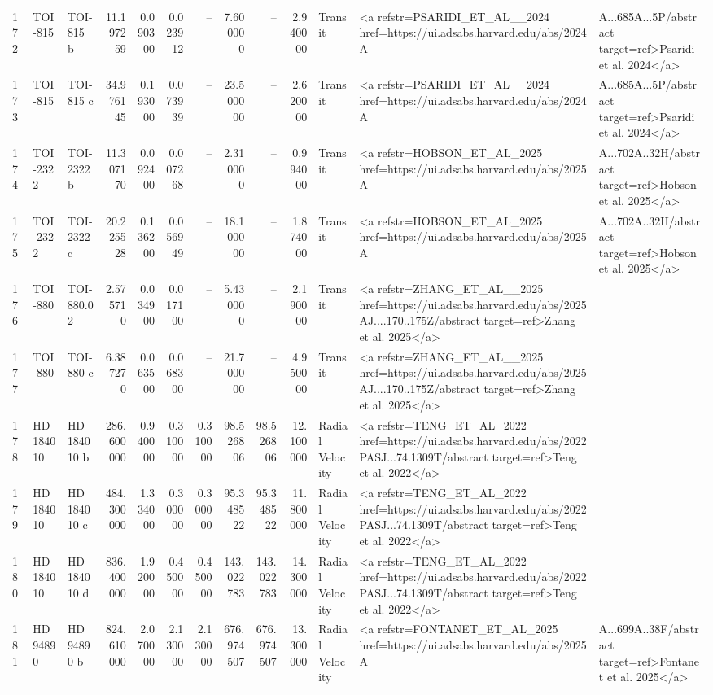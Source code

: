 \begin{tabular}{lllrrrrrrrll}
172 & TOI-815 & TOI-815 b & 11.197259 & 0.090300 & 0.023912 & -- & 7.600000 & -- & 2.940000 & Transit & <a refstr=PSARIDI_ET_AL__2024 href=https://ui.adsabs.harvard.edu/abs/2024A&A...685A...5P/abstract target=ref>Psaridi et al. 2024</a> \\
173 & TOI-815 & TOI-815 c & 34.976145 & 0.193000 & 0.073939 & -- & 23.500000 & -- & 2.620000 & Transit & <a refstr=PSARIDI_ET_AL__2024 href=https://ui.adsabs.harvard.edu/abs/2024A&A...685A...5P/abstract target=ref>Psaridi et al. 2024</a> \\
174 & TOI-2322 & TOI-2322 b & 11.307170 & 0.092400 & 0.007268 & -- & 2.310000 & -- & 0.994000 & Transit & <a refstr=HOBSON_ET_AL_2025 href=https://ui.adsabs.harvard.edu/abs/2025A&A...702A..32H/abstract target=ref>Hobson et al. 2025</a> \\
175 & TOI-2322 & TOI-2322 c & 20.225528 & 0.136200 & 0.056949 & -- & 18.100000 & -- & 1.874000 & Transit & <a refstr=HOBSON_ET_AL_2025 href=https://ui.adsabs.harvard.edu/abs/2025A&A...702A..32H/abstract target=ref>Hobson et al. 2025</a> \\
176 & TOI-880 & TOI-880.02 & 2.575710 & 0.034900 & 0.017100 & -- & 5.430000 & -- & 2.190000 & Transit & <a refstr=ZHANG_ET_AL__2025 href=https://ui.adsabs.harvard.edu/abs/2025AJ....170..175Z/abstract target=ref>Zhang et al. 2025</a> \\
177 & TOI-880 & TOI-880 c & 6.387270 & 0.063500 & 0.068300 & -- & 21.700000 & -- & 4.950000 & Transit & <a refstr=ZHANG_ET_AL__2025 href=https://ui.adsabs.harvard.edu/abs/2025AJ....170..175Z/abstract target=ref>Zhang et al. 2025</a> \\
178 & HD 184010 & HD 184010 b & 286.600000 & 0.940000 & 0.310000 & 0.310000 & 98.526806 & 98.526806 & 12.100000 & Radial Velocity & <a refstr=TENG_ET_AL_2022 href=https://ui.adsabs.harvard.edu/abs/2022PASJ...74.1309T/abstract target=ref>Teng et al. 2022</a> \\
179 & HD 184010 & HD 184010 c & 484.300000 & 1.334000 & 0.300000 & 0.300000 & 95.348522 & 95.348522 & 11.800000 & Radial Velocity & <a refstr=TENG_ET_AL_2022 href=https://ui.adsabs.harvard.edu/abs/2022PASJ...74.1309T/abstract target=ref>Teng et al. 2022</a> \\
180 & HD 184010 & HD 184010 d & 836.400000 & 1.920000 & 0.450000 & 0.450000 & 143.022783 & 143.022783 & 14.300000 & Radial Velocity & <a refstr=TENG_ET_AL_2022 href=https://ui.adsabs.harvard.edu/abs/2022PASJ...74.1309T/abstract target=ref>Teng et al. 2022</a> \\
181 & HD 94890 & HD 94890 b & 824.610000 & 2.070000 & 2.130000 & 2.130000 & 676.974507 & 676.974507 & 13.300000 & Radial Velocity & <a refstr=FONTANET_ET_AL_2025 href=https://ui.adsabs.harvard.edu/abs/2025A&A...699A..38F/abstract target=ref>Fontanet et al. 2025</a> \\

\end{tabular}
